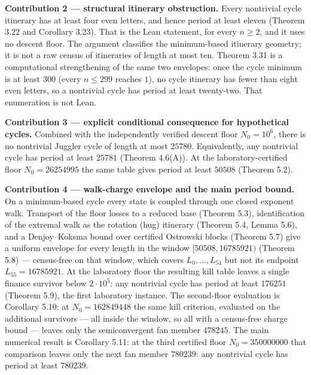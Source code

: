 \documentclass[12pt]{article}
\begin{document}
\textbf{Contribution 2 --- structural itinerary obstruction.} Every
nontrivial cycle itinerary has at least four even letters, and hence
period at least eleven (Theorem 3.22 and Corollary 3.23). That is the
Lean statement, for every \(n\ge 2\), and it uses no descent floor. The
argument classifies the minimum-based itinerary geometry; it is not a
raw census of itineraries of length at most ten. Theorem 3.31 is a
computational strengthening of the same two envelopes: once the cycle
minimum is at least \(300\) (every \(n\le 299\) reaches \(1\)), no cycle
itinerary has fewer than eight even letters, so a nontrivial cycle has
period at least twenty-two. That enumeration is not Lean.

\textbf{Contribution 3 --- explicit conditional consequence for
hypothetical cycles.} Combined with the independently verified descent
floor \(N_0=10^6\), there is no nontrivial Juggler cycle of length at
most \(25780\). Equivalently, any nontrivial cycle has period at least
\(25781\) (Theorem 4.6(A)). At the laboratory-certified floor
\(N_0=26254995\) the same table gives period at least \(50508\) (Theorem
5.2).

\textbf{Contribution 4 --- walk-charge envelope and the main period
bound.} On a minimum-based cycle every state is coupled through one
closed exponent walk. Transport of the floor losses to a reduced base
(Theorem 5.3), identification of the extremal walk as the rotation (hug)
itinerary (Theorem 5.4, Lemma 5.6), and a Denjoy--Koksma bound over
certified Ostrowski blocks (Theorem 5.7) give a uniform envelope for
every length in the window \([50508,16785921)\) (Theorem 5.8) ---
census-free on that window, which covers \(L_0,\ldots,L_{54}\) but not
its endpoint \(L_{55}=16785921\). At the laboratory floor the resulting
kill table leaves a single finance survivor below \(2\cdot 10^5\): any
nontrivial cycle has period at least \(176251\) (Theorem 5.9), the first
laboratory instance. The second-floor evaluation is Corollary 5.10: at
\(N_0=162849448\) the same kill criterion, evaluated on the additional
survivors --- all inside the window, so all with a census-free charge
bound --- leaves only the semiconvergent fan member \(478245\). The main
numerical result is Corollary 5.11: at the third certified floor
\(N_0=350000000\) that comparison leaves only the next fan member
\(780239\): any nontrivial cycle has period at least \(780239\).
\end{document}
